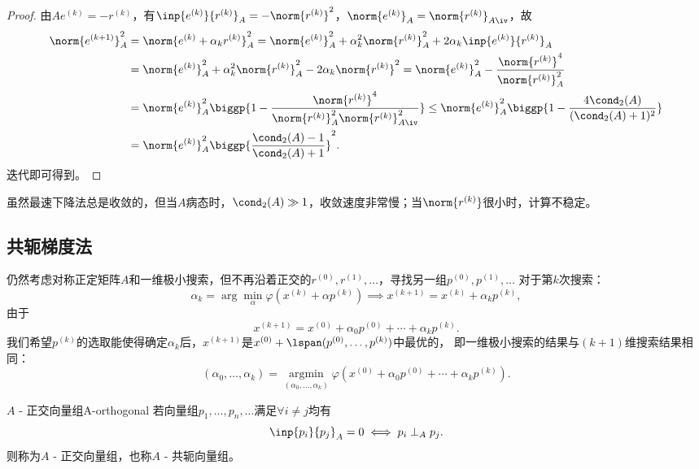 \begin{proof}
    由$Ae^{(k)}=-r^{(k)}$，有$\inp{e^{(k)}}{r^{(k)}}_A=-\norm{r^{(k)}}^2$，$\norm{e^{(k)}}_A=\norm{r^{(k)}}_{A\iv}$，故
    \begin{align*}
        \norm{e^{(k+1)}}_A^2&=\norm{e^{(k)}+\alpha_kr^{(k)}}_A^2
        =\norm{e^{(k)}}_A^2+\alpha_k^2\norm{r^{(k)}}_A^2+2\alpha_k\inp{e^{(k)}}{r^{(k)}}_A\\
        &=\norm{e^{(k)}}_A^2+\alpha_k^2\norm{r^{(k)}}_A^2-2\alpha_k\norm{r^{(k)}}^2=
        \norm{e^{(k)}}_A^2-\frac{\norm{r^{(k)}}^4}{\norm{r^{(k)}}_A^2}\\
        &=\norm{e^{(k)}}_A^2\biggp{1-\frac{\norm{r^{(k)}}^4}{\norm{r^{(k)}}_A^2\norm{r^{(k)}}_{A\iv}^2}}\leq\norm{e^{(k)}}_A^2\biggp{1-\frac{4\cond_2(A)}{(\cond_2(A)+1)^2}}\\
        &=\norm{e^{(k)}}_A^2\biggp{\frac{\cond_2(A)-1}{\cond_2(A)+1}}^2.
    \end{align*}
    迭代即可得到。
\end{proof}

\begin{remark}
    虽然最速下降法总是收敛的，但当$A$病态时，$\cond_2(A)\gg 1$，收敛速度非常慢；当$\norm{r^{(k)}}$很小时，计算不稳定。
\end{remark}

\subsection{共轭梯度法}
\label{ssec:conjugate gradient method}

仍然考虑对称正定矩阵$A$和一维极小搜索，但不再沿着正交的$r^{(0)},r^{(1)},\ldots$，寻找另一组$p^{(0)},p^{(1)},\ldots$
对于第$k$次搜索：
\[
    \alpha_k=\arg\min_\alpha\varphi(x^{(k)}+\alpha p^{(k)})\implies
    x^{(k+1)}=x^{(k)}+\alpha_kp^{(k)},
\]
由于
\[
    x^{(k+1)}=x^{(0)}+\alpha_0p^{(0)}+\cdots+\alpha_kp^{(k)}.
\]
我们希望$p^{(k)}$的选取能使得确定$\alpha_k$后，$x^{(k+1)}$是$x^{(0)}+\lspan(p^{(0)},\ldots,p^{(k)})$中最优的，
即一维极小搜索的结果与$(k+1)$维搜索结果相同：
\[
    (\alpha_0,\ldots,\alpha_k)=\mathop{\arg\min}\limits_{(\alpha_0,\ldots,\alpha_k)}\varphi(x^{(0)}+\alpha_0p^{(0)}+\cdots+\alpha_kp^{(k)}).
\]

\begin{definition}
    {$A$ - 正交向量组}{A-orthogonal}
    若向量组$p_1,\ldots,p_n,\ldots$满足$\forall i\neq j$均有
    \begin{equation}
        \inp{p_i}{p_j}_A=0\iff p_i\perp_A p_j.
    \end{equation}
    则称为$A$ - 正交向量组，也称$A$ - 共轭向量组。
\end{definition}

